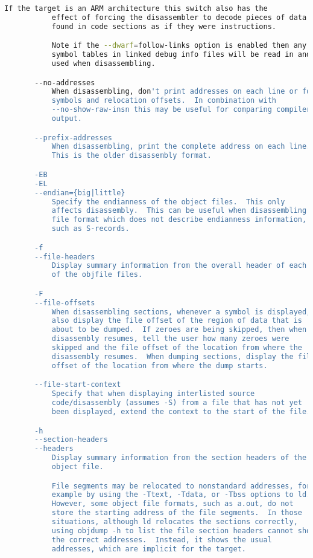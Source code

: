 {{\begin{lstlisting}[language=bash]
           If the target is an ARM architecture this switch also has the
           effect of forcing the disassembler to decode pieces of data
           found in code sections as if they were instructions.

           Note if the --dwarf=follow-links option is enabled then any
           symbol tables in linked debug info files will be read in and
           used when disassembling.

       --no-addresses
           When disassembling, don't print addresses on each line or for
           symbols and relocation offsets.  In combination with
           --no-show-raw-insn this may be useful for comparing compiler
           output.

       --prefix-addresses
           When disassembling, print the complete address on each line.
           This is the older disassembly format.

       -EB
       -EL
       --endian={big|little}
           Specify the endianness of the object files.  This only
           affects disassembly.  This can be useful when disassembling a
           file format which does not describe endianness information,
           such as S-records.

       -f
       --file-headers
           Display summary information from the overall header of each
           of the objfile files.

       -F
       --file-offsets
           When disassembling sections, whenever a symbol is displayed,
           also display the file offset of the region of data that is
           about to be dumped.  If zeroes are being skipped, then when
           disassembly resumes, tell the user how many zeroes were
           skipped and the file offset of the location from where the
           disassembly resumes.  When dumping sections, display the file
           offset of the location from where the dump starts.

       --file-start-context
           Specify that when displaying interlisted source
           code/disassembly (assumes -S) from a file that has not yet
           been displayed, extend the context to the start of the file.

       -h
       --section-headers
       --headers
           Display summary information from the section headers of the
           object file.

           File segments may be relocated to nonstandard addresses, for
           example by using the -Ttext, -Tdata, or -Tbss options to ld.
           However, some object file formats, such as a.out, do not
           store the starting address of the file segments.  In those
           situations, although ld relocates the sections correctly,
           using objdump -h to list the file section headers cannot show
           the correct addresses.  Instead, it shows the usual
           addresses, which are implicit for the target.


\end{lstlisting}}}
